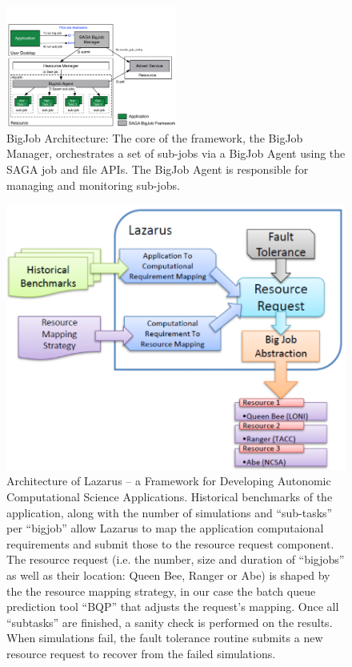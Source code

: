 \documentclass{acm_proc_article-sp}
\newcommand{\jhanote}[1]{ {\textcolor{red} { ***Jha: #1 }}}
\newcommand{\jhanote}[1]{}
\begin{document}
\begin{figure}[ht]
    \centering
    \includegraphics[width=0.5\textwidth]{./bigjob.pdf}
   \caption{BigJob Architecture: The core of the framework, the
      BigJob Manager, orchestrates a set of sub-jobs via a
      BigJob Agent using the SAGA job and file APIs.  The
      BigJob Agent is responsible for managing and monitoring sub-jobs.}
   \label{fig:bigjob}
\end{figure}


\begin{figure}
\centering
\includegraphics[scale=0.55]{figures/Lazarus.pdf}

\caption{Architecture of Lazarus -- a Framework for Developing
  Autonomic Computational Science Applications. Historical benchmarks
of the application, along with the number of simulations and ``sub-tasks''
per ``bigjob'' allow Lazarus to map the application computaional requirements
and submit those to the resource request component. The resource request
(i.e. the number, size and duration of ``bigjobs'' as well as their location: Queen Bee, Ranger or Abe)
is shaped by the the resource mapping strategy, in our case the batch queue
prediction tool ``BQP'' that adjusts the request's mapping. Once all ``subtasks''
are finished, a sanity check is performed on the results. When simulations fail, the fault
tolerance routine submits a new resource request to recover from the failed simulations.}
\label{fig:application_architecture}

\end{figure}
\end{document}
